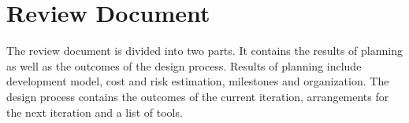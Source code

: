 \section*{Review Document}
The review document is divided into two parts.
It contains the results of planning as well as the outcomes of the design process.
Results of planning include development model, cost and risk estimation, milestones and organization.
The design process contains the outcomes of the current iteration, arrangements for the next iteration and a list of tools.


